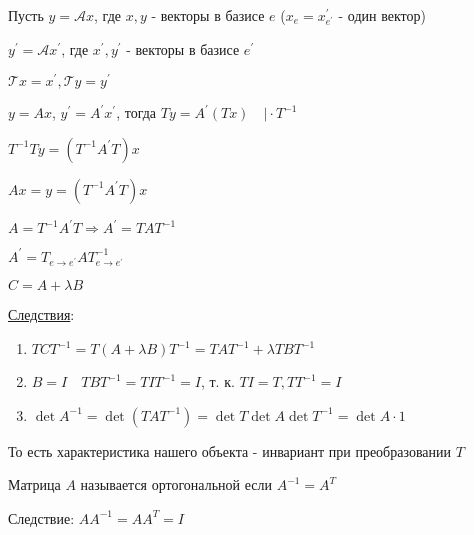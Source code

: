 \documentclass[12pt]{article}
\begin{document}
    \begin{MyProof}
        Пусть $y = \mathcal{A}x$, где $x, y$ - векторы в базисе $e$ ($x_e = x^\prime_{e^\prime}$ - один вектор)

        $y^\prime = \mathcal{A} x^\prime$, где $x^\prime, y^\prime$ - векторы в базисе $e^\prime$

        $\mathcal{T}x = x^\prime, \mathcal{T}y = y^\prime$

        $y = Ax$, $y^\prime = A^\prime x^\prime$, тогда $Ty = A^\prime (Tx) \quad \Big| \cdot T^{-1}$

        $T^{-1}Ty = (T^{-1}A^\prime T)x$
        
        $Ax = y = (T^{-1}A^\prime T)x$

        $A = T^{-1}A^\prime T \Longrightarrow A^\prime = TA T^{-1}$
    \end{MyProof}


    \begin{MyTheorem}
        \Ths $A^\prime = T_{e\to e^\prime} A T^{-1}_{e\to e^\prime}$
    \end{MyTheorem}

    \Nota $C = A + \lambda B$

    \underline{Следствия}:

    \begin{enumerate}
        \item $TCT^{-1} = T (A + \lambda B) T^{-1} = T A T^{-1} + \lambda T B T^{-1}$

        \item $B = I \quad T B T^{-1} = T I T^{-1} = I$, т. к. $TI = T, T T^{-1} = I$

        \item $\det A^{-1} = \det (T A T^{-1}) = \det T \det A \det T^{-1} = \det A \cdot 1$
    \end{enumerate}

    \Nota То есть характеристика нашего объекта - инвариант при преобразовании $T$

    \hypertarget{orthogonalmatrix}{}

    \Def Матрица $A$ называется ортогональной если $A^{-1} = A^T$

    Следствие: $AA^{-1} = AA^T = I$
\end{document}
